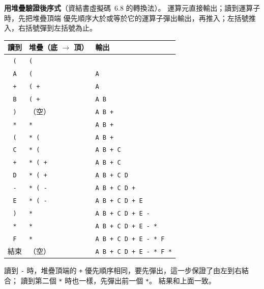 \begin{pastsoln}
\textbf{用堆疊驗證後序式}（資結書虛擬碼~6.8 的轉換法）。 運算元直接輸出；讀到運算子時，先把堆疊頂端
優先順序大於或等於它的運算子彈出輸出，再推入；左括號推入，右括號彈到左括號為止。
\begin{center}
\begin{tabular}{cll}
\toprule
讀到 & 堆疊（底 $\to$ 頂） & 輸出 \\
\midrule
\texttt{(} & \texttt{(} & \\
\texttt{A} & \texttt{(} & \texttt{A} \\
\texttt{+} & \texttt{( +} & \texttt{A} \\
\texttt{B} & \texttt{( +} & \texttt{A B} \\
\texttt{)} & （空） & \texttt{A B +} \\
\texttt{*} & \texttt{*} & \texttt{A B +} \\
\texttt{(} & \texttt{* (} & \texttt{A B +} \\
\texttt{C} & \texttt{* (} & \texttt{A B + C} \\
\texttt{+} & \texttt{* ( +} & \texttt{A B + C} \\
\texttt{D} & \texttt{* ( +} & \texttt{A B + C D} \\
\texttt{-} & \texttt{* ( -} & \texttt{A B + C D +} \\
\texttt{E} & \texttt{* ( -} & \texttt{A B + C D + E} \\
\texttt{)} & \texttt{*} & \texttt{A B + C D + E -} \\
\texttt{*} & \texttt{*} & \texttt{A B + C D + E - *} \\
\texttt{F} & \texttt{*} & \texttt{A B + C D + E - * F} \\
結束 & （空） & \texttt{A B + C D + E - * F *} \\
\bottomrule
\end{tabular}
\end{center}
讀到 \texttt{-} 時，堆疊頂端的 \texttt{+} 優先順序相同，要先彈出，這一步保證了由左到右結合；
讀到第二個 \texttt{*} 時也一樣，先彈出前一個 \texttt{*}。 結果和上面一致。
\end{pastsoln}
